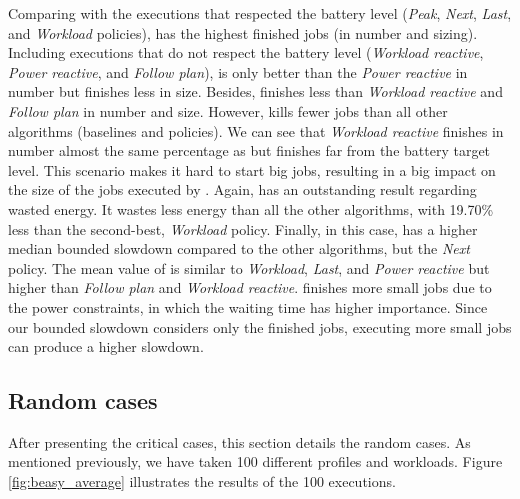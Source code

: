 Comparing \emph{\systemName} with the executions that respected the battery level (\emph{Peak}, \emph{Next}, \emph{Last}, and \emph{Workload} policies), \emph{\systemName} has the highest finished jobs (in number and sizing). Including executions that do not respect the battery level (\emph{Workload reactive}, \emph{Power reactive}, and \emph{Follow plan}), \emph{\systemName} is only better than the \emph{Power reactive} in number but finishes less in size. Besides, \emph{\systemName} finishes less than \emph{Workload reactive} and \emph{Follow plan} in number and size. However, \emph{\systemName} kills fewer jobs than all other algorithms (baselines and policies). We can see that \emph{Workload reactive} finishes in number almost the same percentage as \emph{\systemName} but finishes far from the battery target level. This scenario makes it hard to start big jobs, resulting in a big impact on the size of the jobs executed by \emph{\systemName}. Again, \emph{\systemName} has an outstanding result regarding wasted energy. It wastes less energy than all the other algorithms, with 19.70\% less than the second-best, \emph{Workload} policy. Finally, in this case, \emph{\systemName} has a higher median bounded slowdown compared to the other algorithms, but the \emph{Next} policy. The mean value of \emph{\systemName} is similar to \emph{Workload}, \emph{Last}, and \emph{Power reactive} but higher than \emph{Follow plan} and \emph{Workload reactive}. \emph{\systemName} finishes more small jobs due to the power constraints, in which the waiting time has higher importance. Since our bounded slowdown considers only the finished jobs, executing more small jobs can produce a higher slowdown.


\subsection{Random cases}

After presenting the critical cases, this section details the random cases. As mentioned previously, we have taken 100 different profiles and workloads. Figure \ref{fig:beasy_average} illustrates the results of the 100 executions. 

